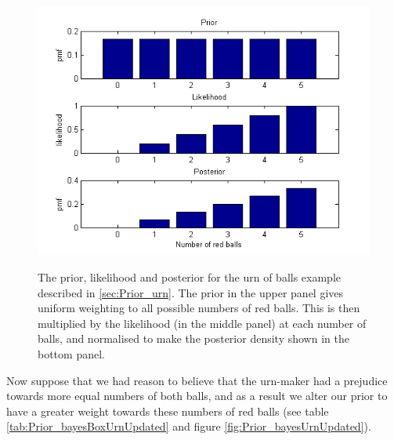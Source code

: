 \documentclass[11pt,fullpage]{book}
\begin{document}
\begin{figure}
\centering
\scalebox{0.75} 
{\includegraphics{Prior_urnStacked.png}}
\caption{The prior, likelihood and posterior for the urn of balls example described in \ref{sec:Prior_urn}. The prior in the upper panel gives uniform weighting to all possible numbers of red balls. This is then multiplied by the likelihood (in the middle panel) at each number of balls, and normalised to make the posterior density shown in the bottom panel.}\label{fig:Prior_urnStacked}
\end{figure}

Now suppose that we had reason to believe that the urn-maker had a prejudice towards more equal numbers of both balls, and as a result we alter our prior to have a greater weight towards these numbers of red balls (see table \ref{tab:Prior_bayesBoxUrnUpdated} and figure \ref{fig:Prior_bayesUrnUpdated}).
\end{document}
